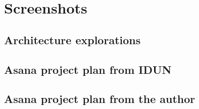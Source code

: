 \chapter{Screenshots}
\label{appendix4-screenshots}

\section*{Architecture explorations}

\section*{Asana project plan from IDUN}

\section*{Asana project plan from the author}
